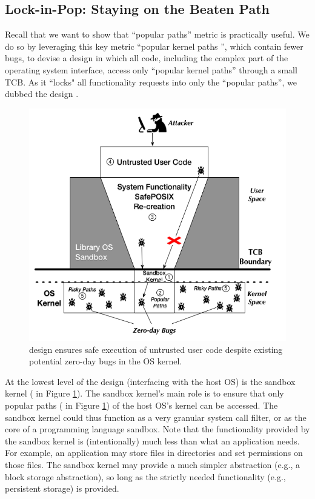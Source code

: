 \subsection{Lock-in-Pop: Staying on the Beaten Path}

Recall that we want to show that ``popular paths'' metric is practically useful. 
We do so by leveraging this key metric ``popular kernel paths '', which contain fewer bugs, to devise a design
in which all code, including the complex part
of the operating system interface, access only
``popular kernel paths'' through a small TCB. As it ``locks" all functionality
requests into only the ``popular paths'', we dubbed the design \lip.

\begin{figure}%
\centering
\includegraphics[width=1.0\columnwidth]{diagram/Virtualization_Design_Model_01.png}
\caption{\small \lip design ensures safe execution of untrusted user code
despite existing potential zero-day bugs in the OS kernel.}
\label{fig:design_safe_reimplementation}
\end{figure}

At the lowest level of the design (interfacing with the host OS) is the
sandbox kernel ( in Figure \ref{fig:design_safe_reimplementation}).
The sandbox kernel's main role is to ensure that only popular paths ( in Figure \ref{fig:design_safe_reimplementation})
of the host OS's kernel can be accessed. 
The sandbox kernel could thus function as a very granular system call filter, or
as the core of a programming language sandbox. Note that the functionality
provided by the sandbox kernel is (intentionally) much less than what
an application needs. For example, an application may store files in directories and set permissions on those files.
The sandbox kernel may provide a much simpler abstraction (e.g., a block storage abstraction),
so long as the strictly needed functionality (e.g., persistent storage) is provided.

